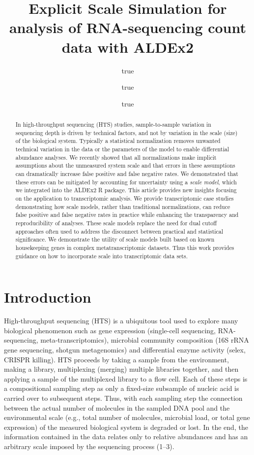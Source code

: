 \documentclass[
]{article}
\title{Explicit Scale Simulation for analysis of RNA-sequencing count
data with ALDEx2}
\author{true \and true \and true}
\date{}
\begin{document}
\maketitle
\begin{abstract}
In high-throughput sequencing (HTS) studies, sample-to-sample variation
in sequencing depth is driven by technical factors, and not by variation
in the scale (size) of the biological system. Typically a statistical
normalization removes unwanted technical variation in the data or the
parameters of the model to enable differential abundance analyses. We
recently showed that all normalizations make implicit assumptions about
the unmeasured system scale and that errors in these assumptions can
dramatically increase false positive and false negative rates. We
demonstrated that these errors can be mitigated by accounting for
uncertainty using a \emph{scale model}, which we integrated into the
ALDEx2 R package. This article provides new insights focusing on the
application to transcriptomic analysis. We provide transcriptomic case
studies demonstrating how scale models, rather than traditional
normalizations, can reduce false positive and false negative rates in
practice while enhancing the transparency and reproducibility of
analyses. These scale models replace the need for dual cutoff approaches
often used to address the disconnect between practical and statistical
significance. We demonstrate the utility of scale models built based on
known housekeeping genes in complex metatranscriptomic datasets. Thus
this work provides guidance on how to incorporate scale into
transcriptomic data sets.
\end{abstract}

\section{Introduction}\label{introduction}

\doublespacing \singlespacing 
\linenumbers

High-throughput sequencing (HTS) is a ubiquitous tool used to explore
many biological phenomenon such as gene expression (single-cell
sequencing, RNA-sequencing, meta-transcriptomics), microbial community
composition (16S rRNA gene sequencing, shotgun metagenomics) and
differential enzyme activity (selex, CRISPR killing). HTS proceeds by
taking a sample from the environment, making a library, multiplexing
(merging) multiple libraries together, and then applying a sample of the
multiplexed library to a flow cell. Each of these steps is a
compositional sampling step as only a fixed-size subsample of nucleic
acid is carried over to subsequent steps. Thus, with each sampling step
the connection between the actual number of molecules in the sampled DNA
pool and the environmental scale (e.g., total number of molecules,
microbial load, or total gene expression) of the measured biological
system is degraded or lost. In the end, the information contained in the
data relates only to relative abundances and has an arbitrary scale
imposed by the sequencing process (1--3).
\end{document}

